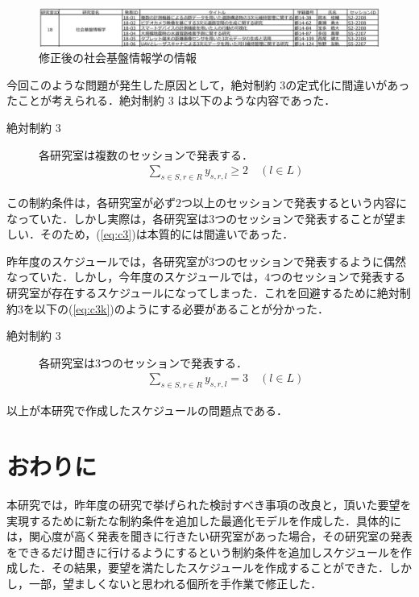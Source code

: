 \documentclass[a4paper,12pt,fleqn]{jarticle}
\begin{document}
\begin{figure}[H]
  \begin{center}
    \includegraphics[scale=0.75]{kubotaa.png}
    \caption{修正後の社会基盤情報学の情報}
    \label{fig:kubotaa}
  \end{center}
\end{figure}

今回このような問題が発生した原因として，絶対制約 $3 $の定式化に間違いがあったことが考えられる．絶対制約 $3$ は以下のような内容であった．

\begin{description}
\item[絶対制約 $3$] 各研究室は複数のセッションで発表する．
\begin{eqnarray}\label{eq:c3}
    \sum_{s \in S, r \in R} y_{s,r,l} \geq 2 \quad (l \in L)
  \end{eqnarray}
\end{description}

この制約条件は，各研究室が必ず$2$つ以上のセッションで発表するという内容になっていた．しかし実際は，各研究室は$3$つのセッションで発表することが望ましい．そのため，(\ref{eq:c3})は本質的には間違いであった．

昨年度のスケジュールでは，各研究室が$3$つのセッションで発表するように偶然なっていた．しかし，今年度のスケジュールでは，$4$つのセッションで発表する研究室が存在するスケジュールになってしまった．これを回避するために絶対制約$3$を以下の(\ref{eq:c3k})のようにする必要があることが分かった．

\begin{description}
\item[絶対制約 $3$] 各研究室は$3$つのセッションで発表する．
\begin{eqnarray}\label{eq:c3k}
    \sum_{s \in S, r \in R} y_{s,r,l} = 3 \quad (l \in L)
  \end{eqnarray}
\end{description}

以上が本研究で作成したスケジュールの問題点である．


\newpage
\section{おわりに}
本研究では，昨年度の研究\cite{wakabayasi}で挙げられた検討すべき事項の改良と，頂いた要望を実現するために新たな制約条件を追加した最適化モデルを作成した．具体的には，関心度が高く発表を聞きに行きたい研究室があった場合，その研究室の発表をできるだけ聞きに行けるようにするという制約条件を追加しスケジュールを作成した．その結果，要望を満たしたスケジュールを作成することができた．しかし，一部，望ましくないと思われる個所を手作業で修正した．
\end{document}
